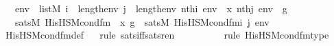 \begin{isabellebody}
\ \ \ {\isachardoublequoteopen}env\ {\isasymin}\ list{\isacharparenleft}{\kern0pt}M{\isacharparenright}{\kern0pt}{\isachardoublequoteclose}\ {\isachardoublequoteopen}i\ {\isacharless}{\kern0pt}\ length{\isacharparenleft}{\kern0pt}env{\isacharparenright}{\kern0pt}{\isachardoublequoteclose}\ {\isachardoublequoteopen}j\ {\isacharless}{\kern0pt}\ length{\isacharparenleft}{\kern0pt}env{\isacharparenright}{\kern0pt}{\isachardoublequoteclose}\ {\isachardoublequoteopen}nth{\isacharparenleft}{\kern0pt}i{\isacharcomma}{\kern0pt}\ env{\isacharparenright}{\kern0pt}\ {\isacharequal}{\kern0pt}\ x{\isacharprime}{\kern0pt}{\isachardoublequoteclose}\ {\isachardoublequoteopen}nth{\isacharparenleft}{\kern0pt}j{\isacharcomma}{\kern0pt}\ env{\isacharparenright}{\kern0pt}\ {\isacharequal}{\kern0pt}\ g{\isachardoublequoteclose}\ \isanewline
\ \ \ {\isachardoublequoteopen}sats{\isacharparenleft}{\kern0pt}M{\isacharcomma}{\kern0pt}\ His{\isacharunderscore}{\kern0pt}HS{\isacharunderscore}{\kern0pt}M{\isacharunderscore}{\kern0pt}cond{\isacharunderscore}{\kern0pt}fm{\isacharparenleft}{\kern0pt}{}{\isacharcomma}{\kern0pt}\ {}{\isacharparenright}{\kern0pt}{\isacharcomma}{\kern0pt}\ {\isacharbrackleft}{\kern0pt}x{\isacharprime}{\kern0pt}{\isacharcomma}{\kern0pt}\ g{\isacharbrackright}{\kern0pt}{\isacharparenright}{\kern0pt}\ {\isasymlongleftrightarrow}\ sats{\isacharparenleft}{\kern0pt}M{\isacharcomma}{\kern0pt}\ His{\isacharunderscore}{\kern0pt}HS{\isacharunderscore}{\kern0pt}M{\isacharunderscore}{\kern0pt}cond{\isacharunderscore}{\kern0pt}fm{\isacharprime}{\kern0pt}{\isacharparenleft}{\kern0pt}i{\isacharcomma}{\kern0pt}\ j{\isacharparenright}{\kern0pt}{\isacharcomma}{\kern0pt}\ env{\isacharparenright}{\kern0pt}{\isachardoublequoteclose}\ \isanewline
%
\isadelimproof
\isanewline
\ \ %
\endisadelimproof
%
\isatagproof
{}\isamarkupfalse%
\ His{\isacharunderscore}{\kern0pt}HS{\isacharunderscore}{\kern0pt}M{\isacharunderscore}{\kern0pt}cond{\isacharunderscore}{\kern0pt}fm{\isacharprime}{\kern0pt}{\isacharunderscore}{\kern0pt}def\isanewline
\ \ \isamarkupfalse%
{\isacharparenleft}{\kern0pt}rule\ sats{\isacharunderscore}{\kern0pt}iff{\isacharunderscore}{\kern0pt}sats{\isacharunderscore}{\kern0pt}ren{\isacharparenright}{\kern0pt}\isanewline
\ \ \ \ \ \ \ \ \ \isamarkupfalse%
{\isacharparenleft}{\kern0pt}rule\ His{\isacharunderscore}{\kern0pt}HS{\isacharunderscore}{\kern0pt}M{\isacharunderscore}{\kern0pt}cond{\isacharunderscore}{\kern0pt}fm{\isacharunderscore}{\kern0pt}type{\isacharparenright}{\kern0pt}\isanewline

\end{isabellebody}
